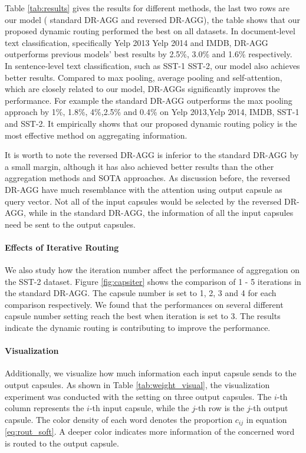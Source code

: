 \documentclass[11pt]{article}
\begin{document}
Table \ref{tab:results} gives the results for different methods, the last two rows are our model ( standard DR-AGG  and reversed DR-AGG), the table shows that our proposed dynamic routing performed the best on all datasets. 
In document-level text classification, specifically Yelp 2013 Yelp 2014 and IMDB, DR-AGG outperforms previous models’ best results by 2.5\%, 3.0\% and 1.6\% respectively. In sentence-level text classification, such as SST-1 SST-2, our model also achieves better results. 
Compared to max pooling, average pooling and self-attention, which are closely related to our model, DR-AGGs significantly improves the performance. For example the standard DR-AGG outperforms the max pooling approach by 1\%, 1.8\%, 4\%,2.5\% and 0.4\% on Yelp 2013,Yelp 2014, IMDB, SST-1 and SST-2. It empirically shows that our proposed dynamic routing policy is the most effective method on aggregating information. 

It is worth to note the reversed DR-AGG is inferior to the standard 
DR-AGG by a small margin, although it has also achieved better results than the other aggregation methods and SOTA approaches. 
As discussion before, the reversed DR-AGG have much resemblance with the  attention using output capsule as query vector. Not all of the input capsules would be selected by the reversed DR-AGG, while in the standard DR-AGG, the information of all the input capsules need be sent to the output capsules.

\paragraph{Effects of Iterative Routing} We also study how the iteration number affect the performance of aggregation on the SST-2 dataset.  Figure \ref{fig:capsiter} shows the comparison of 1 - 5 iterations in the standard DR-AGG. The capsule number is set to 1, 2, 3 and 4 for each comparison respectively. We found that  the performances on several different capsule number setting reach the best when iteration is set to 3. The results indicate the dynamic routing is contributing to improve the performance.

\paragraph{Visualization}
Additionally, we visualize how much information each input capsule sends to the output capsules. As shown in Table \ref{tab:weight_visual}, the visualization experiment was conducted with the setting on three output capsules. 
The $i$-th column represents the $i$-th input capsule, while the $j$-th row is the $j$-th output capsule. The color density of each word denotes the proportion $c_{ij}$ in equation \ref{eq:rout_soft}.  
A deeper color indicates more information of the concerned word is routed to the output capsule.
\end{document}
